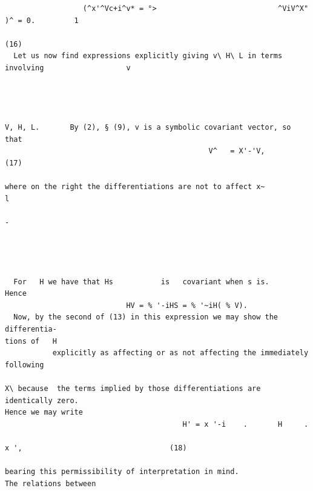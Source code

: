 \documentclass[10pt]{article}
\begin{document}
\begin{verbatim}
                  (^x'^Vc+i^v* = °>                            ^ViV^X" )^ = 0.         1
                                                                                                               (16)
  Let us now find expressions explicitly giving v\ H\ L in terms involving                   v




V, H, L.       By (2), § (9), v is a symbolic covariant vector, so that
                                               V^   = X'-'V,                                                   (17)

where on the right the differentiations are not to affect x~                                      l
                                                                                                      -




  For   H we have that Hs           is   covariant when s is.                        Hence
                            HV = % '-iHS = % '~iH( % V).
  Now, by the second of (13) in this expression we may show the differentia-
tions of   H
           explicitly as affecting or as not affecting the immediately following

X\ because  the terms implied by those differentiations are identically zero.
Hence we may write
                                         H' = x '-i    .       H     .
                                                                         x ',                                  (18)

bearing this permissibility of interpretation in mind.                                     The relations between

\end{verbatim}
\end{document}

